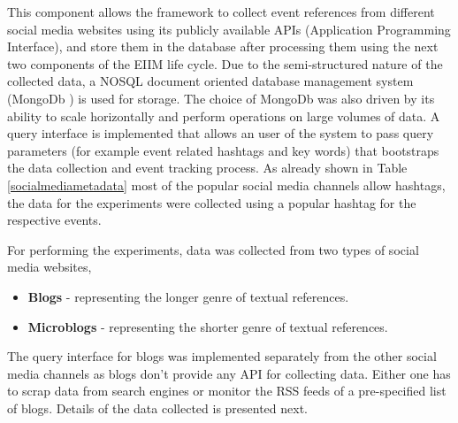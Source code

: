 This component allows the framework to collect event references from different social media websites using its publicly available APIs (Application Programming Interface), and store them in the database after processing them using the next two components of the EIIM life cycle. Due to the semi-structured nature of the collected data, a NOSQL document oriented database management system (MongoDb ) is used for storage. The choice of MongoDb was also driven by its ability to scale horizontally and perform operations on large volumes of data. A query interface is implemented that allows an user of the system to pass query parameters (for example event related hashtags and key words) that bootstraps the data collection and event tracking process. As already shown in Table \ref{socialmediametadata} most of the popular social media channels allow hashtags, the data for the experiments were collected using a popular hashtag for the respective events. 

For performing the experiments, data was collected from two types of social media websites, 
\begin{itemize}
\item \textbf{Blogs} - representing the longer genre of textual references.
\item \textbf{Microblogs} - representing the shorter genre of textual references.
\end{itemize}

The query interface for blogs was implemented separately from the other social media channels as blogs don't provide any API for collecting data. Either one has to scrap data from search engines or monitor the RSS feeds of a pre-specified list of blogs. Details of the data collected is presented next. 


